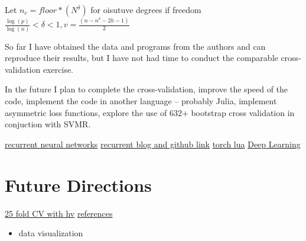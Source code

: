 \documentclass[12pt]{article}
\begin{document}
Let $n_c= floor*(N^\delta)$ for oisutuve degrees if freedom $\frac{\log(p)}{\log(n)}<\delta<1, v=\frac{(n-n^\delta-2h-1)}{2}$


So far  I have
 obtained the data and programs from the authors and can reproduce 
their results, but I have not had 
time to conduct the comparable cross-validation exercise.

In the future I plan to complete the cross-validation,
improve the speed of the code,
implement the code in another language -- probably Julia,
implement asymmetric loss functions,
explore the use of 632+ bootstrap cross validation in conjuction with 
SVMR.

\href{http://www.wildml.com/2015/09/recurrent-neural-networks-tutorial-part-1-introduction-to-rnns/}{recurrent neural networks}
\href{http://karpathy.github.io/2015/05/21/rnn-effectiveness/}{recurrent blog and github link}
\href{http://torch.ch/}{torch lua}
\href{http://colah.github.io/posts/2015-09-NN-Types-FP/}{Deep Learning} 
\section{Future Directions}
\label{sec:future-directions}

\cite{journals/ijon/Cao03,conf/icml/TaiebH14}

\href{https://www.researchgate.net/figure/51762586_fig2_Fig-2-Cross-validation-error-estimate-obtained-by-25-fold-cross-validation-with-Ridge}{25 fold CV with hv}
\href{http://www.svms.org/regression/}{references}
\begin{itemize}
\item data visualization
\end{itemize}



\end{document}
